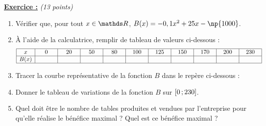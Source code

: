 \documentclass[12pt,french]{book}
\renewenvironment{exo}[1]{%
  \refstepcounter{exo}\underline{\textbf{Exercice \theexo :}} \quad \textit{#1}\par
  \medskip}%
{\bigskip}
\begin{document}
\begin{exo}{(13 points)}
    \begin{enumerate}
        \item Vérifier que, pour tout $x \in \R$, $B(x) = -0,1x^2 + 25x - \np{1000}$.
        \item À l'aide de la calculatrice, remplir de tableau de valeurs ci-dessous :
            \[\begin{array}{|c|*{10}{>{\centering\arraybackslash}p{1cm}|}}
                \hline
                    x & 0 & 20 & 50 & 80 & 100 & 125 & 150 & 170 & 200 & 230 \\
                \hline
                    B(x) & & & & & & & & & & \\
                \hline
            \end{array}\]
            
        \item Tracer la courbe représentative de la fonction $B$ dans le repère ci-dessous :
        
        
        \item Donner le tableau de variations de la fonction $B$ sur $\left[0\,;230\right]$.
        
        \item Quel doit être le nombre de tables produites et vendues par l'entreprise pour qu'elle réalise le bénéfice maximal ? Quel est ce bénéfice maximal ?
    \end{enumerate}
\end{exo}

\clearpage
\end{document}
